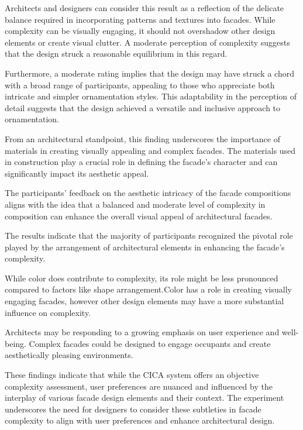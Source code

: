  Architects and designers can consider this result as a reflection of the delicate balance required in incorporating patterns and textures into facades.
 While complexity can be visually engaging, it should not overshadow other design elements or create visual clutter.
 A moderate perception of complexity suggests that the design struck a reasonable equilibrium in this regard.


Furthermore, a moderate rating implies that the design may have struck a chord with a broad range of participants, appealing to those who appreciate both intricate and simpler ornamentation styles.
 This adaptability in the perception of detail suggests that the design achieved a versatile and inclusive approach to ornamentation.


From an architectural standpoint, this finding underscores the importance of materials in creating visually appealing and complex facades.
 The materials used in construction play a crucial role in defining the facade's character and can significantly impact its aesthetic appeal.

The participants' feedback on the aesthetic intricacy of the facade compositions aligns with the idea that a balanced and moderate level of complexity in composition can enhance the overall visual appeal of architectural facades.

The results indicate that the majority of participants recognized the pivotal role played by the arrangement of architectural elements in enhancing the facade's complexity.

While color does contribute to complexity, its role might be less pronounced compared to factors like shape arrangement.Color has a role in creating visually engaging facades, however other design elements may have a more substantial influence on complexity.

 Architects may be responding to a growing emphasis on user experience and well-being.
 Complex facades could be designed to engage occupants and create aesthetically pleasing environments.

These findings indicate that while the CICA system offers an objective complexity assessment, user preferences are nuanced and influenced by the interplay of various facade design elements and their context.
 The experiment underscores the need for designers to consider these subtleties in facade complexity to align with user preferences and enhance architectural design.

